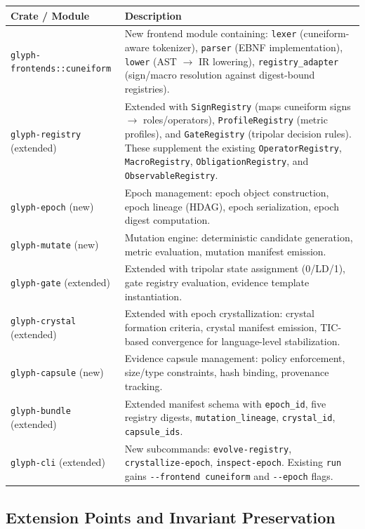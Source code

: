\documentclass[11pt,a4paper,twoside]{article}
\theoremstyle{definition}
\theoremstyle{remark}
\begin{document}
\begin{longtable}{lp{8cm}}
\toprule
\textbf{Crate / Module} & \textbf{Description} \\
\midrule
\endfirsthead
\texttt{glyph-frontends::cuneiform} & New frontend module containing: \texttt{lexer} (cuneiform-aware tokenizer), \texttt{parser} (EBNF implementation), \texttt{lower} (AST $\to$ IR lowering), \texttt{registry\_adapter} (sign/macro resolution against digest-bound registries). \\
\addlinespace
\texttt{glyph-registry} (extended) & Extended with \texttt{SignRegistry} (maps cuneiform signs $\to$ roles/operators), \texttt{ProfileRegistry} (metric profiles), and \texttt{GateRegistry} (tripolar decision rules). These supplement the existing \texttt{OperatorRegistry}, \texttt{MacroRegistry}, \texttt{ObligationRegistry}, and \texttt{ObservableRegistry}. \\
\addlinespace
\texttt{glyph-epoch} (new) & Epoch management: epoch object construction, epoch lineage (HDAG), epoch serialization, epoch digest computation. \\
\addlinespace
\texttt{glyph-mutate} (new) & Mutation engine: deterministic candidate generation, metric evaluation, mutation manifest emission. \\
\addlinespace
\texttt{glyph-gate} (extended) & Extended with tripolar state assignment (0/LD/1), gate registry evaluation, evidence template instantiation. \\
\addlinespace
\texttt{glyph-crystal} (extended) & Extended with epoch crystallization: crystal formation criteria, crystal manifest emission, TIC-based convergence for language-level stabilization. \\
\addlinespace
\texttt{glyph-capsule} (new) & Evidence capsule management: policy enforcement, size/type constraints, hash binding, provenance tracking. \\
\addlinespace
\texttt{glyph-bundle} (extended) & Extended manifest schema with \texttt{epoch\_id}, five registry digests, \texttt{mutation\_lineage}, \texttt{crystal\_id}, \texttt{capsule\_ids}. \\
\addlinespace
\texttt{glyph-cli} (extended) & New subcommands: \texttt{evolve-registry}, \texttt{crystallize-epoch}, \texttt{inspect-epoch}. Existing \texttt{run} gains \texttt{-{}-frontend cuneiform} and \texttt{-{}-epoch} flags. \\
\bottomrule
\end{longtable}

\subsection{Extension Points and Invariant Preservation}
\end{document}

